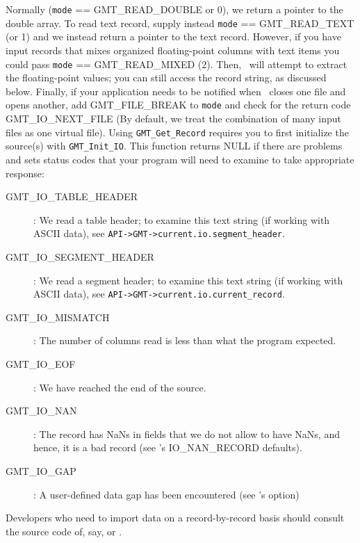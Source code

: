 \documentclass[11pt]{report}
\begin{document}
Normally (\texttt{mode} == GMT\_READ\_DOUBLE or 0), we return a pointer to the double array.
To read text record, supply instead \texttt{mode} == GMT\_READ\_TEXT (or 1) and we
instead return a pointer to the text record.
However, if you have input records that mixes organized floating-point columns with text
items you could pass \texttt{mode} == GMT\_READ\_MIXED (2).  Then, \GMT\ will attempt to extract the
floating-point values; you can still access the record string, as discussed below.
Finally, if your application needs to be notified when \GMT\ closes one file and opens another,
add GMT\_FILE\_BREAK to \texttt{mode} and check for the return code GMT\_IO\_NEXT\_FILE (By
default, we treat the combination of many input files as one virtual file).
Using \texttt{GMT\_Get\_Record} requires you to first initialize the source(s)
with \texttt{GMT\_Init\_IO}.  This function returns NULL if there are problems and sets status codes that your
program will need to examine to take appropriate response:
\begin{description}
\item [GMT\_IO\_TABLE\_HEADER]: We read a table header; to examine this text string
(if working with ASCII data), see \texttt{API->GMT->current.io.segment\_header}.
\item [GMT\_IO\_SEGMENT\_HEADER]: We read a segment header; to examine this text string
(if working with ASCII data), see \texttt{API->GMT->current.io.current\_record}.
\item [GMT\_IO\_MISMATCH]: The number of columns read is less than what the program expected.
\item [GMT\_IO\_EOF]: We have reached the end of the source.
\item [GMT\_IO\_NAN]: The record has NaNs in fields that we do not allow to have NaNs, and
hence, it is a bad record (see \GMT's IO\_NAN\_RECORD defaults). 
\item [GMT\_IO\_GAP]: A user-defined data gap has been encountered (see \GMT's  option)
\end{description}
Developers who need to import data on a record-by-record basis should consult the source
code of, say,  or .
\end{document}

